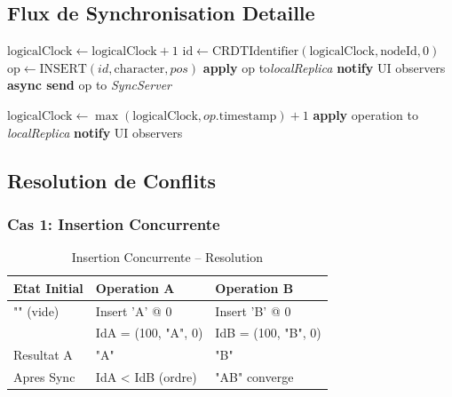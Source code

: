 \documentclass[11pt,a4paper,hidelinks]{book}
\begin{document}
\subsection{Flux de Synchronisation Detaille}

\begin{algorithm}[H]
\caption{Algorithme de Synchronisation CRDT}
\begin{algorithmic}[1]
    \State $\text{logicalClock} \gets \text{logicalClock} + 1$
    \State $\text{id} \gets \text{CRDTIdentifier}(\text{logicalClock}, \text{nodeId}, 0)$
    \State $\text{op} \gets \text{INSERT}(id, \text{character}, pos)$
    \State \textbf{apply} $\text{op}$ to\textit{localReplica}
    \State \textbf{notify} UI observers
    \State \textbf{async send} op to \textit{SyncServer}
\EndProcedure

    \State $\text{logicalClock} \gets \max(\text{logicalClock}, op.\text{timestamp}) + 1$
    \State \textbf{apply} operation to \textit{localReplica}
    \State \textbf{notify} UI observers
\EndProcedure
\end{algorithmic}
\end{algorithm}

\subsection{Resolution de Conflits}

\subsubsection{Cas 1: Insertion Concurrente}

\begin{table}[H]
\centering
\caption{Insertion Concurrente -- Resolution}
\begin{tabularx}{\textwidth}{l l l}
\toprule
\textbf{Etat Initial} & \textbf{Operation A} & \textbf{Operation B} \\
\midrule
"" (vide) & Insert 'A' @ 0 & Insert 'B' @ 0 \\
& IdA = (100, "A", 0) & IdB = (100, "B", 0) \\
\midrule
Resultat A & "A" & "B" \\
\midrule
Apres Sync & IdA < IdB (ordre) & "AB" converge \\
\bottomrule
\end{tabularx}
\end{table}
\end{document}
